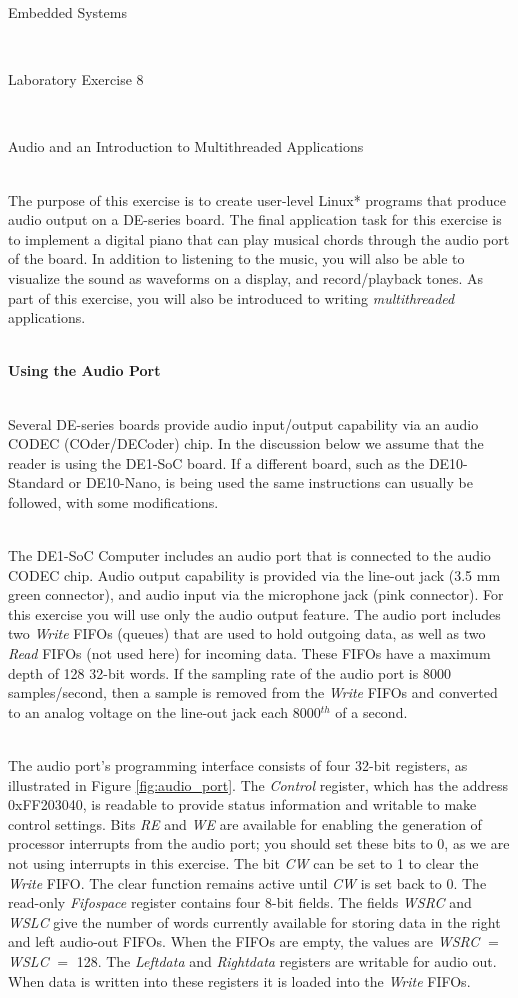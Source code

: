 \documentclass[epsfig,10pt,fullpage]{article}
\newcommand{\LabNum}{8}
\begin{document}
\centerline{\huge Embedded Systems}
~\\
\centerline{\huge Laboratory Exercise \LabNum}
~\\
\centerline{\large Audio and an Introduction to Multithreaded Applications}
~\\

\noindent
The purpose of this exercise is to create user-level Linux* programs that 
produce audio output on a DE-series board. The final application task for this exercise is
to implement a digital piano that can play musical chords through the audio port of the board.
In addition to listening to the music, you will also be able to visualize the sound as
waveforms on a display, and record/playback tones. As part of this exercise, you will also
be introduced to writing {\it multithreaded} applications.

~\\
\noindent
{\bf Using the Audio Port}

~\\
\noindent
Several DE-series boards provide audio input/output capability via an audio CODEC (COder/DECoder) 
chip. In the discussion below we assume that the reader is using the DE1-SoC board. If 
a different board, such as the DE10-Standard or DE10-Nano, is being used the same instructions 
can usually be followed, with some modifications.

~\\
\noindent
The DE1-SoC Computer includes an audio port that is connected to the audio CODEC chip. 
Audio output capability is provided via the line-out jack (3.5 mm green connector), and 
audio input via the microphone jack (pink connector).
For this exercise you will use only the audio output feature. The audio port includes 
two {\it Write} FIFOs (queues) that are used to hold outgoing data, as well as two {\it Read}
FIFOs (not used here) for incoming data. These FIFOs have a maximum depth of 128 32-bit words.
If the sampling rate of the audio port is 8000 samples/second, then a sample is removed 
from the {\it Write} FIFOs and converted to an analog voltage on the line-out jack each 
8000$^{th}$ of a second.

~\\
\noindent
The audio port's programming interface consists of four 32-bit registers, as illustrated in 
Figure \ref{fig:audio_port}. The {\it Control} register, which has the address {\sf 0xFF203040},
is readable to provide status information and writable to make control settings. Bits {\it RE}
and {\it WE} are available for enabling the generation of processor interrupts from the
audio port; you should set these bits to 0, as we are not using interrupts in this exercise.
The bit {\it CW} can be set to 1 to clear the {\it Write} FIFO. The clear function remains
active until {\it CW} is set back to 0. The read-only {\it Fifospace} register contains four
8-bit fields. The fields {\it WSRC} and {\it WSLC} give the number of words currently available
for storing data in the right and left audio-out FIFOs. When the FIFOs are empty, the values
are {\it WSRC} $=$ {\it WSLC} $=$ 128. The {\it Leftdata} and {\it Rightdata} registers
are writable for audio out. When data is written into these registers it is loaded into the 
{\it Write} FIFOs.
\end{document}

